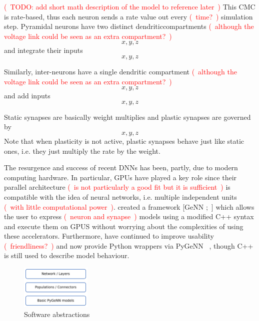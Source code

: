 \documentclass{article}
\newcommand{\pygenn}{{PyGeNN }}
\newcommand{\genn}{{GeNN }}
\newcommand\note[1]{\textcolor{red}{(~#1~)}}
\begin{document}
\note{TODO: add short math description of the model to reference later}
This CMC is rate-based, thus each neuron sends a rate value out every \note{time?} simulation step. 
Pyramidal neurons have two distinct dendriticcompartments \note{although the voltage link could be seen as an extra compartment?}
\begin{equation}
    x,y,z
\end{equation}
and integrate their inputs 
\begin{equation}
    x,y,z
\end{equation}

Similarly, inter-neurons have a single dendritic compartment \note{although the voltage link could be seen as an extra compartment?}
\begin{equation}
    x,y,z
\end{equation}
and add inputs 
\begin{equation}
    x,y,z
\end{equation}

Static synapses are basically weight multiplies and plastic synapses are governed by
\begin{equation}
    x,y,z
\end{equation}
Note that when plasticity is not active, plastic synapses behave just like static ones, i.e. they just multiply the rate by the weight.

The resurgence and success of recent DNNs has been, partly, due to modern computing hardware.
In particular, GPUs have played a key role since their parallel architecture \note{is not particularly a good fit but it is sufficient} is compatible with the idea of neural networks, i.e. multiple independent units \note{with little computational power}.
\citeauthor{genn} created a framework [\genn;~] which allows the user to express \note{neuron and synapse} models using a modified C++ syntax and execute them on GPUS without worrying about the complexities of using these accelerators.
Furthermore, \citeauthor{pygenn} have continued to improve usability \note{friendliness?} and now provide Python wrappers via \pygenn~\citep{pygenn}, though C++ is still used to describe model behaviour.

\begin{figure}[h!bt]
    \centering
    \includegraphics[width=0.3\textwidth]{abstraction_layers.png}
    \caption{Software abstractions}
    \label{fig:abstractions}
\end{figure}
\end{document}

